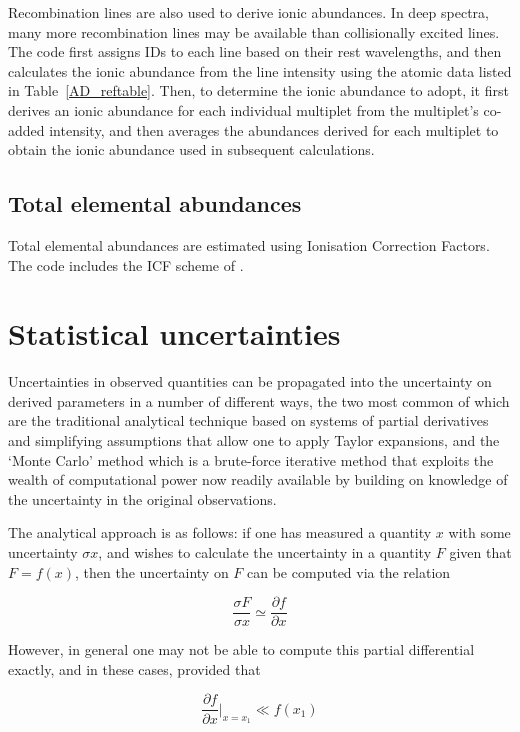 \documentclass[useAMS,usenatbib]{mn2e}
\begin{document}
Recombination lines are also used to derive ionic abundances.  In deep spectra, many more recombination lines may be available than collisionally excited lines.  The code first assigns IDs to each line based on their rest wavelengths, and then calculates the ionic abundance from the line intensity using the atomic data listed in Table~\ref{AD_reftable}.  Then, to determine the ionic abundance to adopt, it first derives an ionic abundance for each individual multiplet from the multiplet's co-added intensity, and then averages the abundances derived for each multiplet to obtain the ionic abundance used in subsequent calculations.

\subsection{Total elemental abundances}

Total elemental abundances are estimated using Ionisation Correction Factors.  The code includes the ICF scheme of \citet{1994MNRAS.271..257K}.

\section{Statistical uncertainties}

Uncertainties in observed quantities can be propagated into the uncertainty on derived parameters in a number of different ways, the two most common of which are the traditional analytical technique based on systems of partial derivatives and simplifying assumptions that allow one to apply Taylor expansions, and the `Monte Carlo' method which is a brute-force iterative method that exploits the wealth of computational power now readily available by building on knowledge of the uncertainty in the original observations.

The analytical approach is as follows: if one has measured a quantity $x$ with some uncertainty $\sigma x$, and wishes to calculate the uncertainty in a quantity $F$ given that $F = f(x)$, then the uncertainty on $F$ can be computed via the relation 

\begin{equation}
  \frac{\sigma F}{\sigma x} \simeq \frac{\partial f}{\partial x}
\end{equation}

However, in general one may not be able to compute this partial differential exactly, and in these cases, provided that

\begin{equation}
  \frac{\partial f}{\partial x}|_{x=x_1} \ll f(x_1)
\end{equation}
\end{document}
